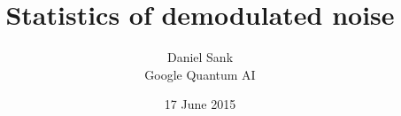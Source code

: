 \documentclass{article}
\title{Statistics of demodulated noise}
\author{Daniel Sank\\ \small{Google Quantum AI}}
\date{17 June 2015}
\begin{document}
\maketitle

\begin{abstract}

\end{abstract}





\end{document}
